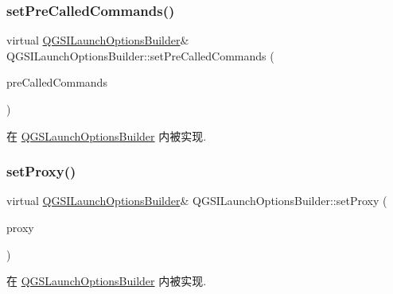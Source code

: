 \subsubsection{\texorpdfstring{set\+Pre\+Called\+Commands()}{setPreCalledCommands()}}
{\footnotesize\ttfamily virtual \mbox{\hyperlink{class_q_g_s_i_launch_options_builder}{Q\+G\+S\+I\+Launch\+Options\+Builder}}\& Q\+G\+S\+I\+Launch\+Options\+Builder\+::set\+Pre\+Called\+Commands (\begin{DoxyParamCaption}\item[{const Q\+String \&}]{pre\+Called\+Commands }\end{DoxyParamCaption})\hspace{0.3cm}{\ttfamily [pure virtual]}}



在 \mbox{\hyperlink{class_q_g_s_launch_options_builder_a83840a81a87e550a9140cea27cf73af1}{Q\+G\+S\+Launch\+Options\+Builder}} 内被实现.

\mbox{\label{class_q_g_s_i_launch_options_builder_a73c506f75e24bc57493e8c7dbcc4c4d2}} 
\subsubsection{\texorpdfstring{set\+Proxy()}{setProxy()}}
{\footnotesize\ttfamily virtual \mbox{\hyperlink{class_q_g_s_i_launch_options_builder}{Q\+G\+S\+I\+Launch\+Options\+Builder}}\& Q\+G\+S\+I\+Launch\+Options\+Builder\+::set\+Proxy (\begin{DoxyParamCaption}\item[{const Q\+Network\+Proxy \&}]{proxy }\end{DoxyParamCaption})\hspace{0.3cm}{\ttfamily [pure virtual]}}



在 \mbox{\hyperlink{class_q_g_s_launch_options_builder_a28a1a465e5e8f22cf34151ee29b33a64}{Q\+G\+S\+Launch\+Options\+Builder}} 内被实现.

\mbox{\label{class_q_g_s_i_launch_options_builder_adbb11b42b51fa0503ac673e7fc9ad100}} 
